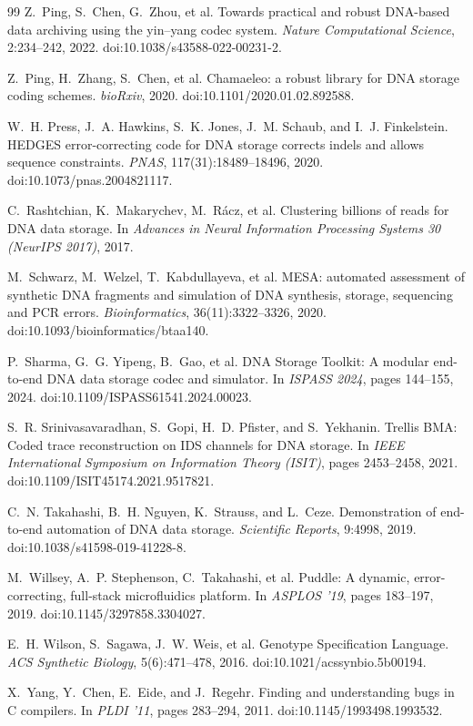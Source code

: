 \documentclass[11pt,a4paper]{article}
\begin{document}
\begin{thebibliography}{99}
Z.~Ping, S.~Chen, G.~Zhou, et al.
\newblock Towards practical and robust DNA-based data archiving using the yin--yang codec system.
\newblock \emph{Nature Computational Science}, 2:234--242, 2022.
\newblock doi:10.1038/s43588-022-00231-2.

Z.~Ping, H.~Zhang, S.~Chen, et al.
\newblock Chamaeleo: a robust library for DNA storage coding schemes.
\newblock \emph{bioRxiv}, 2020.
\newblock doi:10.1101/2020.01.02.892588.

W.~H. Press, J.~A. Hawkins, S.~K. Jones, J.~M. Schaub, and I.~J. Finkelstein.
\newblock HEDGES error-correcting code for DNA storage corrects indels and allows sequence constraints.
\newblock \emph{PNAS}, 117(31):18489--18496, 2020.
\newblock doi:10.1073/pnas.2004821117.

C.~Rashtchian, K.~Makarychev, M.~R\'acz, et al.
\newblock Clustering billions of reads for DNA data storage.
\newblock In \emph{Advances in Neural Information Processing Systems 30 (NeurIPS 2017)}, 2017.

M.~Schwarz, M.~Welzel, T.~Kabdullayeva, et al.
\newblock MESA: automated assessment of synthetic DNA fragments and simulation of DNA synthesis, storage, sequencing and PCR errors.
\newblock \emph{Bioinformatics}, 36(11):3322--3326, 2020.
\newblock doi:10.1093/bioinformatics/btaa140.

P.~Sharma, G.~G. Yipeng, B.~Gao, et al.
\newblock DNA Storage Toolkit: A modular end-to-end DNA data storage codec and simulator.
\newblock In \emph{ISPASS 2024}, pages 144--155, 2024.
\newblock doi:10.1109/ISPASS61541.2024.00023.

S.~R. Srinivasavaradhan, S.~Gopi, H.~D. Pfister, and S.~Yekhanin.
\newblock Trellis BMA: Coded trace reconstruction on IDS channels for DNA storage.
\newblock In \emph{IEEE International Symposium on Information Theory (ISIT)}, pages 2453--2458, 2021.
\newblock doi:10.1109/ISIT45174.2021.9517821.

C.~N. Takahashi, B.~H. Nguyen, K.~Strauss, and L.~Ceze.
\newblock Demonstration of end-to-end automation of DNA data storage.
\newblock \emph{Scientific Reports}, 9:4998, 2019.
\newblock doi:10.1038/s41598-019-41228-8.

M.~Willsey, A.~P. Stephenson, C.~Takahashi, et al.
\newblock Puddle: A dynamic, error-correcting, full-stack microfluidics platform.
\newblock In \emph{ASPLOS '19}, pages 183--197, 2019.
\newblock doi:10.1145/3297858.3304027.

E.~H. Wilson, S.~Sagawa, J.~W. Weis, et al.
\newblock Genotype Specification Language.
\newblock \emph{ACS Synthetic Biology}, 5(6):471--478, 2016.
\newblock doi:10.1021/acssynbio.5b00194.

X.~Yang, Y.~Chen, E.~Eide, and J.~Regehr.
\newblock Finding and understanding bugs in C compilers.
\newblock In \emph{PLDI '11}, pages 283--294, 2011.
\newblock doi:10.1145/1993498.1993532.

\end{thebibliography}
\end{document}
